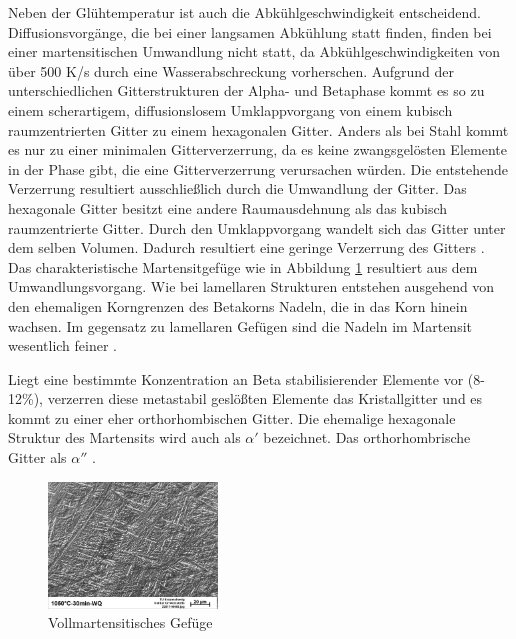 \documentclass[a4paper, 11pt]{tubsreprt}
\begin{document}
Neben der Glühtemperatur ist auch die Abkühlgeschwindigkeit entscheidend. Diffusionsvorgänge, die bei einer langsamen Abkühlung statt finden, finden bei einer martensitischen Umwandlung nicht statt, da Abkühlgeschwindigkeiten von über 500 K/s durch eine Wasserabschreckung vorherschen. Aufgrund der unterschiedlichen Gitterstrukturen der Alpha- und Betaphase kommt es so zu einem scherartigem, diffusionslosem Umklappvorgang von einem kubisch raumzentrierten Gitter zu einem hexagonalen Gitter. Anders als bei Stahl kommt es nur zu einer minimalen Gitterverzerrung, da es keine zwangsgelösten Elemente in der Phase gibt, die eine Gitterverzerrung verursachen würden. Die entstehende Verzerrung resultiert ausschließlich durch die Umwandlung der Gitter. Das hexagonale Gitter besitzt eine andere Raumausdehnung als das kubisch raumzentrierte Gitter. Durch den Umklappvorgang wandelt sich das Gitter unter dem selben Volumen. Dadurch resultiert eine geringe Verzerrung des Gitters \cite{Luetjering2007}. Das charakteristische Martensitgefüge wie in Abbildung \ref{vollmartensit} resultiert aus dem Umwandlungsvorgang. Wie bei lamellaren Strukturen entstehen ausgehend von den ehemaligen Korngrenzen des Betakorns Nadeln, die in das Korn hinein wachsen. Im gegensatz zu lamellaren Gefügen sind die Nadeln im Martensit wesentlich feiner \cite{Luetjering2007}.

Liegt eine bestimmte Konzentration an Beta stabilisierender Elemente vor (8-12\%)\cite{Boyer1994}, verzerren diese metastabil geslößten Elemente das Kristallgitter und es kommt zu einer eher orthorhombischen Gitter. Die ehemalige hexagonale Struktur des Martensits wird auch als $\alpha'$ bezeichnet. Das orthorhombrische Gitter als $\alpha''$ \cite{Luetjering2007}. 

\begin{figure}
\centering
\includegraphics[width=0.4\textwidth]{Bilder/Vollmartensit.jpg}
\caption{Vollmartensitisches Gefüge}
\label{vollmartensit}
\end{figure}
\end{document}
